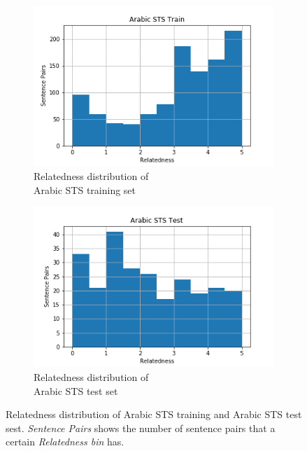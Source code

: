 \begin{enumerate}
\begin{figure}
	\captionsetup[subfigure]{justification=centering}
	\centering
	\begin{subfigure}[b]{.5\textwidth}
		\centering
		\includegraphics[width=\textwidth]{figures/semantic_textual_similarity/introduction/sts_arabic_train.png}
		\caption{Relatedness distribution of \\ Arabic STS  training set}
		\label{fig:arabic_train_relatedness}
	\end{subfigure}%
	\begin{subfigure}[b]{.5\textwidth}
		\centering
		\includegraphics[width=\textwidth]{figures/semantic_textual_similarity/introduction/sts_arabic_test.png}
		\caption{Relatedness distribution of \\ Arabic STS  test set}
		\label{fig:arabic_test_relatedness}
	\end{subfigure}
	\caption[Relatedness distribution of Arabic STS training and Arabic STS test sets]{Relatedness distribution of Arabic STS training and Arabic STS test sest. \textit{Sentence Pairs} shows the number of sentence pairs that a certain \textit{Relatedness bin} has.}
	\label{fig:arabic_sts_relatedness}
\end{figure} 




\end{enumerate}
